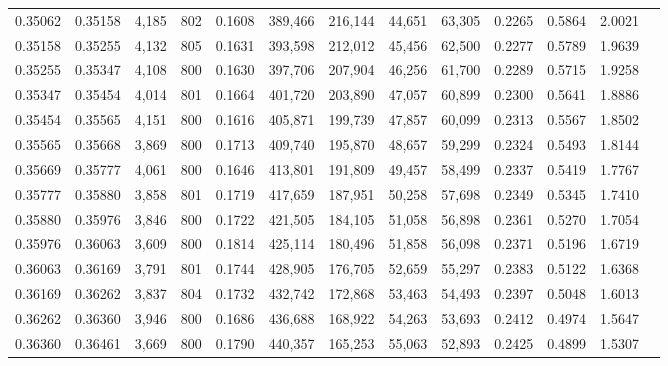 \begin{tabular}{rrrrrrrrrrrrr}
0.35062 & 0.35158 &  4,185 & 802 &                                     0.1608 & 389,466 & 216,144 &  44,651 &  63,305 & 0.2265 & 0.5864 & 2.0021 \\
0.35158 & 0.35255 &  4,132 & 805 &                                     0.1631 & 393,598 & 212,012 &  45,456 &  62,500 & 0.2277 & 0.5789 & 1.9639 \\
0.35255 & 0.35347 &  4,108 & 800 &                                     0.1630 & 397,706 & 207,904 &  46,256 &  61,700 & 0.2289 & 0.5715 & 1.9258 \\
0.35347 & 0.35454 &  4,014 & 801 &                                     0.1664 & 401,720 & 203,890 &  47,057 &  60,899 & 0.2300 & 0.5641 & 1.8886 \\
0.35454 & 0.35565 &  4,151 & 800 &                                     0.1616 & 405,871 & 199,739 &  47,857 &  60,099 & 0.2313 & 0.5567 & 1.8502 \\
0.35565 & 0.35668 &  3,869 & 800 &                                     0.1713 & 409,740 & 195,870 &  48,657 &  59,299 & 0.2324 & 0.5493 & 1.8144 \\
0.35669 & 0.35777 &  4,061 & 800 &                                     0.1646 & 413,801 & 191,809 &  49,457 &  58,499 & 0.2337 & 0.5419 & 1.7767 \\
0.35777 & 0.35880 &  3,858 & 801 &                                     0.1719 & 417,659 & 187,951 &  50,258 &  57,698 & 0.2349 & 0.5345 & 1.7410 \\
0.35880 & 0.35976 &  3,846 & 800 &                                     0.1722 & 421,505 & 184,105 &  51,058 &  56,898 & 0.2361 & 0.5270 & 1.7054 \\
0.35976 & 0.36063 &  3,609 & 800 &                                     0.1814 & 425,114 & 180,496 &  51,858 &  56,098 & 0.2371 & 0.5196 & 1.6719 \\
0.36063 & 0.36169 &  3,791 & 801 &                                     0.1744 & 428,905 & 176,705 &  52,659 &  55,297 & 0.2383 & 0.5122 & 1.6368 \\
0.36169 & 0.36262 &  3,837 & 804 &                                     0.1732 & 432,742 & 172,868 &  53,463 &  54,493 & 0.2397 & 0.5048 & 1.6013 \\
0.36262 & 0.36360 &  3,946 & 800 &                                     0.1686 & 436,688 & 168,922 &  54,263 &  53,693 & 0.2412 & 0.4974 & 1.5647 \\
0.36360 & 0.36461 &  3,669 & 800 &                                     0.1790 & 440,357 & 165,253 &  55,063 &  52,893 & 0.2425 & 0.4899 & 1.5307 \\

\end{tabular}
